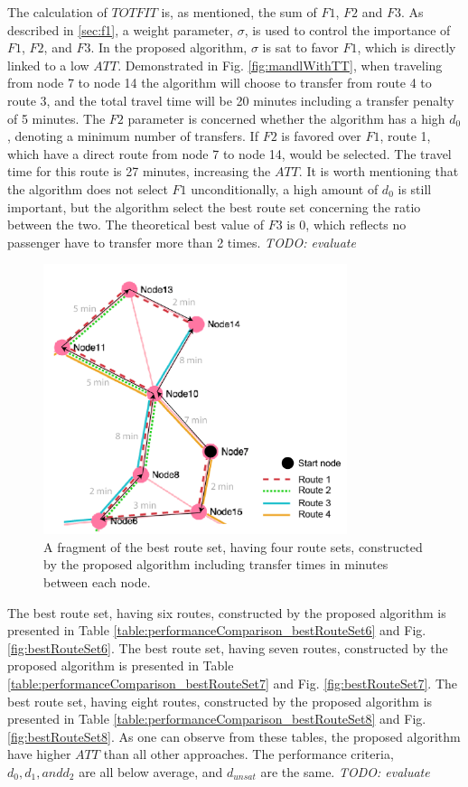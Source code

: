 The calculation of $TOTFIT$ is, as mentioned, the sum of $F1$, $F2$ and $F3$. As described in \vref{sec:f1}, a weight parameter, $\sigma$, is used to control the importance of $F1$, $F2$, and $F3$. In the proposed algorithm, $\sigma$ is sat to favor $F1$, which is directly linked to a low $ATT$. Demonstrated in Fig. \vref{fig:mandlWithTT}, when traveling from node 7 to node 14 the algorithm will choose to transfer from route 4 to route 3, and the total travel time will be 20 minutes including a transfer penalty of 5 minutes. The $F2$ parameter is concerned whether the algorithm has a high $d_0$, denoting a minimum number of transfers. If $F2$ is favored over $F1$, route 1, which have a direct route from node 7 to node 14, would be selected. The travel time for this route is 27 minutes, increasing the $ATT$. It is worth mentioning that the algorithm does not select $F1$ unconditionally, a high amount of $d_0$ is still important, but the algorithm select the best route set concerning the ratio between the two. The theoretical best value of $F3$ is 0, which reflects no passenger have to transfer more than 2 times. \emph{\color{blue} TODO: evaluate}

\begin{figure}[H]
    \begin{center}
    \includegraphics[width=3.5in]{assets/mandl_withTT_utsnitt.png}
    \end{center}
    \caption{A fragment of the best route set, having four route sets, constructed by the proposed algorithm including transfer times in minutes between each node.}
    \label{fig:mandlWithTT} 
\end{figure}

The best route set, having six routes, constructed by the proposed algorithm is presented in Table \vref{table:performanceComparison_bestRouteSet6} and Fig. \vref{fig:bestRouteSet6}.  The best route set, having seven routes, constructed by the proposed algorithm is presented in Table \vref{table:performanceComparison_bestRouteSet7} and Fig. \vref{fig:bestRouteSet7}. The best route set, having eight routes, constructed by the proposed algorithm is presented in Table \vref{table:performanceComparison_bestRouteSet8} and Fig. \vref{fig:bestRouteSet8}. As one can observe from these tables, the proposed algorithm have higher $ATT$ than all other approaches. The performance criteria, $d_0, d_1, and d_{2}$ are all below average, and $d_{unsat}$ are the same. \emph{\color{blue} TODO: evaluate}


